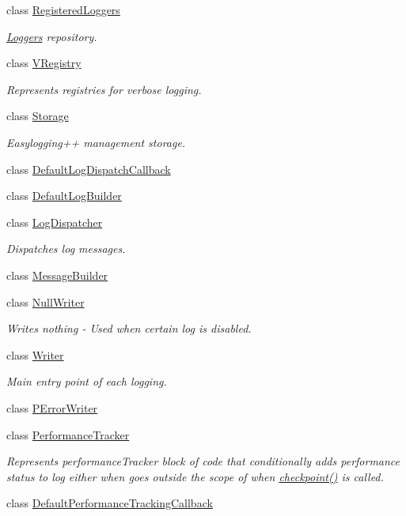 \begin{DoxyCompactItemize}
class \hyperlink{classel_1_1base_1_1RegisteredLoggers}{Registered\-Loggers}
\begin{DoxyCompactList}\small\item\em \hyperlink{classel_1_1Loggers}{Loggers} repository. \end{DoxyCompactList}\item 
class \hyperlink{classel_1_1base_1_1VRegistry}{V\-Registry}
\begin{DoxyCompactList}\small\item\em Represents registries for verbose logging. \end{DoxyCompactList}\item 
class \hyperlink{classel_1_1base_1_1Storage}{Storage}
\begin{DoxyCompactList}\small\item\em Easylogging++ management storage. \end{DoxyCompactList}\item 
class \hyperlink{classel_1_1base_1_1DefaultLogDispatchCallback}{Default\-Log\-Dispatch\-Callback}
\item 
class \hyperlink{classel_1_1base_1_1DefaultLogBuilder}{Default\-Log\-Builder}
\item 
class \hyperlink{classel_1_1base_1_1LogDispatcher}{Log\-Dispatcher}
\begin{DoxyCompactList}\small\item\em Dispatches log messages. \end{DoxyCompactList}\item 
class \hyperlink{classel_1_1base_1_1MessageBuilder}{Message\-Builder}
\item 
class \hyperlink{classel_1_1base_1_1NullWriter}{Null\-Writer}
\begin{DoxyCompactList}\small\item\em Writes nothing -\/ Used when certain log is disabled. \end{DoxyCompactList}\item 
class \hyperlink{classel_1_1base_1_1Writer}{Writer}
\begin{DoxyCompactList}\small\item\em Main entry point of each logging. \end{DoxyCompactList}\item 
class \hyperlink{classel_1_1base_1_1PErrorWriter}{P\-Error\-Writer}
\item 
class \hyperlink{classel_1_1base_1_1PerformanceTracker}{Performance\-Tracker}
\begin{DoxyCompactList}\small\item\em Represents performance\-Tracker block of code that conditionally adds performance status to log either when goes outside the scope of when \hyperlink{classel_1_1base_1_1PerformanceTracker_aec9a6e149674c5782cc855e49aeb0aaf}{checkpoint()} is called. \end{DoxyCompactList}\item 
class \hyperlink{classel_1_1base_1_1DefaultPerformanceTrackingCallback}{Default\-Performance\-Tracking\-Callback}
\end{DoxyCompactItemize}
